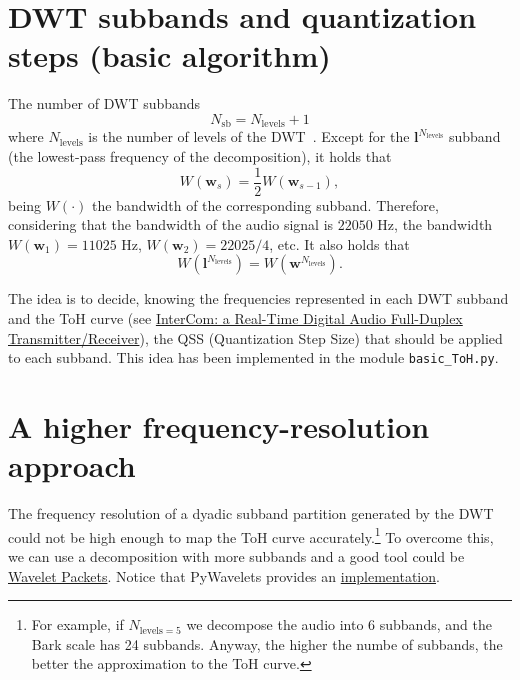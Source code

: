 \section{DWT subbands and quantization steps (basic algorithm)}
The number of DWT subbands
\begin{equation}
  N_{\text{sb}} = N_{\text{levels}} + 1
\end{equation}
where $N_{\text{levels}}$ is the number of levels of the
DWT~\cite{vetterli1995wavelets}. Except for the
${\mathbf l}^{N_{\text{levels}}}$ subband (the lowest-pass frequency
of the decomposition), it holds that
\begin{equation}
  W({\mathbf w}_s) = \frac{1}{2}W({\mathbf w}_{s-1}),
\end{equation}
being $W(\cdot)$ the bandwidth of the corresponding
subband. Therefore, considering that the bandwidth of the audio signal
is $22050$ Hz, the bandwidth $W({\mathbf w}_1)=11025$ Hz,
$W({\mathbf w}_2)=22025/4$, etc. It also holds that
\begin{equation}
  W({\mathbf l}^{N_{\text{levels}}}) = W({\mathbf w}^{N_{\text{levels}}}).
\end{equation}

The idea is to decide, knowing the frequencies represented in each DWT
subband and the ToH curve (see
\href{https://github.com/Tecnologias-multimedia/InterCom/blob/master/docs/2-hours_seminar.ipynb}{
  InterCom: a Real-Time Digital Audio Full-Duplex
  Transmitter/Receiver}), the QSS (Quantization Step Size) that should
be applied to each subband. This idea has been implemented in the
module \verb|basic_ToH.py|.

\section{A higher frequency-resolution approach}
\label{sec:FFT}

The frequency resolution of a dyadic subband partition generated by
the DWT could not be high enough to map the ToH curve
accurately.\footnote{For example, if $N_{\text{levels}=5}$ we
  decompose the audio into 6 subbands, and the Bark scale has 24
  subbands. Anyway, the higher the numbe of subbands, the better the
  approximation to the ToH curve.} To overcome this, we can use a
decomposition with more subbands and a good tool could be
\href{https://en.wikipedia.org/wiki/Wavelet_packet_decomposition}{Wavelet
  Packets}. Notice that PyWavelets provides an
\href{https://pywavelets.readthedocs.io/en/latest/ref/wavelet-packets.html}{implementation}.

